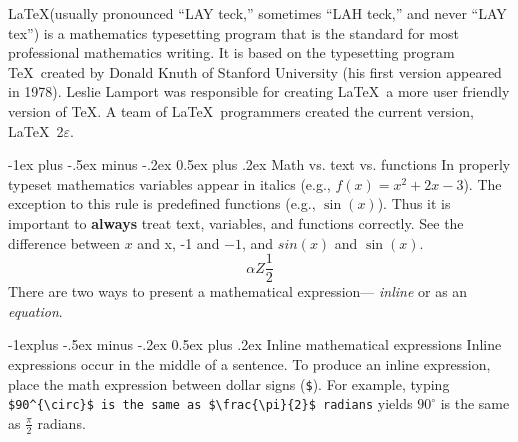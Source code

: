 \documentclass[a4paper,10pt]{article}
\makeatletter
\renewcommand{\section}{\@startsection{section}{1}{0mm}%
                                {-1ex plus -.5ex minus -.2ex}%
                                {0.5ex plus .2ex}%
                                {\normalfont\large\bfseries}}
\renewcommand{\subsection}{\@startsection{subsection}{2}{0mm}%
                                {-1explus -.5ex minus -.2ex}%
                                {0.5ex plus .2ex}%
                                {\normalfont\normalsize\bfseries}}
\makeatother
\begin{document}
\begin{multicols}{3}
















































    \LaTeX (usually pronounced ``LAY teck,'' sometimes ``LAH teck,'' and never ``LAY tex'') is a mathematics typesetting program that is the standard for most professional mathematics writing. It is based on the typesetting program \TeX\ created by Donald Knuth of Stanford University (his first version appeared in 1978). Leslie Lamport was responsible for creating \LaTeX\, a more user friendly version of \TeX. A team of \LaTeX\ programmers created the current version,  \LaTeX\ 2$\varepsilon$.

    \section{Math vs. text vs. functions}
    In properly typeset mathematics  variables appear in italics (e.g., $f(x)=x^{2}+2x-3$). The exception to this rule is predefined functions (e.g., $\sin (x)$). Thus it is important to \textbf{always} treat text, variables, and functions correctly. See the difference between $x$ and x, -1 and $-1$, and $sin(x)$ and $\sin(x)$.
    \[ \alpha Z \frac{1}{2}\]
    There are two ways to present a mathematical expression--- \emph{inline} or as an \emph{equation}.

    \subsection{Inline mathematical expressions}
    Inline expressions occur in the middle of a sentence.  To produce an inline expression, place the math expression between dollar signs (\verb!$!).  For example, typing \verb!$90^{\circ}$ is the same as $\frac{\pi}{2}$ radians!  yields $90^{\circ}$ is the same as $\frac{\pi}{2}$ radians.


\end{multicols}
\end{document}
